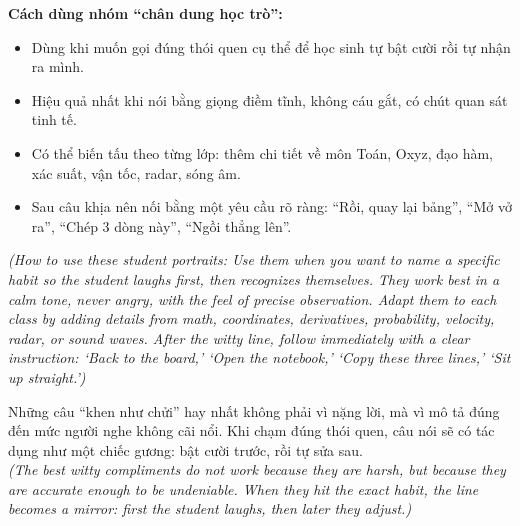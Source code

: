 \begin{enumerate}[leftmargin=*,resume]


\end{enumerate}

\begin{tuhocnhanh}
\textbf{Cách dùng nhóm ``chân dung học trò'':}\\[4pt]
\begin{itemize}[leftmargin=*]
  \item Dùng khi muốn gọi đúng thói quen cụ thể để học sinh tự bật cười rồi tự nhận ra mình.
  \item Hiệu quả nhất khi nói bằng giọng điềm tĩnh, không cáu gắt, có chút quan sát tinh tế.
  \item Có thể biến tấu theo từng lớp: thêm chi tiết về môn Toán, Oxyz, đạo hàm, xác suất, vận tốc, radar, sóng âm.
  \item Sau câu khịa nên nối bằng một yêu cầu rõ ràng: ``Rồi, quay lại bảng'', ``Mở vở ra'', ``Chép 3 dòng này'', ``Ngồi thẳng lên''.
\end{itemize}
\textit{(How to use these student portraits: Use them when you want to name a specific habit so the student laughs first, then recognizes themselves. They work best in a calm tone, never angry, with the feel of precise observation. Adapt them to each class by adding details from math, coordinates, derivatives, probability, velocity, radar, or sound waves. After the witty line, follow immediately with a clear instruction: `Back to the board,' `Open the notebook,' `Copy these three lines,' `Sit up straight.')}
\end{tuhocnhanh}

\begin{baihoc}
Những câu ``khen như chửi'' hay nhất không phải vì nặng lời, mà vì mô tả đúng đến mức người nghe không cãi nổi. Khi chạm đúng thói quen, câu nói sẽ có tác dụng như một chiếc gương: bật cười trước, rồi tự sửa sau.\\
\textit{(The best witty compliments do not work because they are harsh, but because they are accurate enough to be undeniable. When they hit the exact habit, the line becomes a mirror: first the student laughs, then later they adjust.)}
\end{baihoc}
